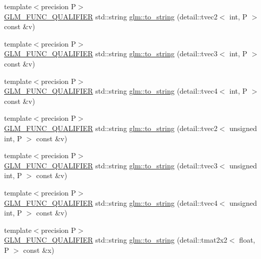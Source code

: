 \begin{DoxyCompactItemize}
\item 
{\footnotesize template$<$precision P$>$ }\\\hyperlink{setup_8hpp_a33fdea6f91c5f834105f7415e2a64407}{G\+L\+M\+\_\+\+F\+U\+N\+C\+\_\+\+Q\+U\+A\+L\+I\+F\+I\+ER} std\+::string \hyperlink{namespaceglm_acf6a59b44afdda0d868ded648576d48f}{glm\+::to\+\_\+string} (detail\+::tvec2$<$ int, P $>$ const \&v)
\item 
{\footnotesize template$<$precision P$>$ }\\\hyperlink{setup_8hpp_a33fdea6f91c5f834105f7415e2a64407}{G\+L\+M\+\_\+\+F\+U\+N\+C\+\_\+\+Q\+U\+A\+L\+I\+F\+I\+ER} std\+::string \hyperlink{namespaceglm_a79470a720acf0a316891820afe09e162}{glm\+::to\+\_\+string} (detail\+::tvec3$<$ int, P $>$ const \&v)
\item 
{\footnotesize template$<$precision P$>$ }\\\hyperlink{setup_8hpp_a33fdea6f91c5f834105f7415e2a64407}{G\+L\+M\+\_\+\+F\+U\+N\+C\+\_\+\+Q\+U\+A\+L\+I\+F\+I\+ER} std\+::string \hyperlink{namespaceglm_a78dd6af1769c80de03bb124d73e274f2}{glm\+::to\+\_\+string} (detail\+::tvec4$<$ int, P $>$ const \&v)
\item 
{\footnotesize template$<$precision P$>$ }\\\hyperlink{setup_8hpp_a33fdea6f91c5f834105f7415e2a64407}{G\+L\+M\+\_\+\+F\+U\+N\+C\+\_\+\+Q\+U\+A\+L\+I\+F\+I\+ER} std\+::string \hyperlink{namespaceglm_a801319a82197f1c81cd8ec003bbb73d0}{glm\+::to\+\_\+string} (detail\+::tvec2$<$ unsigned int, P $>$ const \&v)
\item 
{\footnotesize template$<$precision P$>$ }\\\hyperlink{setup_8hpp_a33fdea6f91c5f834105f7415e2a64407}{G\+L\+M\+\_\+\+F\+U\+N\+C\+\_\+\+Q\+U\+A\+L\+I\+F\+I\+ER} std\+::string \hyperlink{namespaceglm_a696c89ed265323c985319eecccf3ddc8}{glm\+::to\+\_\+string} (detail\+::tvec3$<$ unsigned int, P $>$ const \&v)
\item 
{\footnotesize template$<$precision P$>$ }\\\hyperlink{setup_8hpp_a33fdea6f91c5f834105f7415e2a64407}{G\+L\+M\+\_\+\+F\+U\+N\+C\+\_\+\+Q\+U\+A\+L\+I\+F\+I\+ER} std\+::string \hyperlink{namespaceglm_a50a689738a61d3beddf88fbeae5ab2cc}{glm\+::to\+\_\+string} (detail\+::tvec4$<$ unsigned int, P $>$ const \&v)
\item 
{\footnotesize template$<$precision P$>$ }\\\hyperlink{setup_8hpp_a33fdea6f91c5f834105f7415e2a64407}{G\+L\+M\+\_\+\+F\+U\+N\+C\+\_\+\+Q\+U\+A\+L\+I\+F\+I\+ER} std\+::string \hyperlink{namespaceglm_a0eb5e5f8bfab4c965ed9f4d8f0ef910a}{glm\+::to\+\_\+string} (detail\+::tmat2x2$<$ float, P $>$ const \&x)

\end{DoxyCompactItemize}

